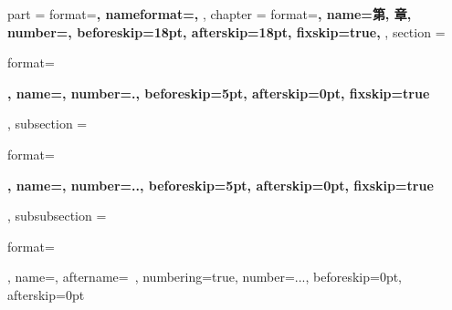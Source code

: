 {

    {
        \ctexset
        {
            part =
            {
                format=\centering{}\bfseries,
                nameformat=\centering\heiti\fontsize{48}{48}\bfseries,
            },
            chapter =
            {
                format=\centering{}\bfseries,
                name={第, 章},
                number=,
                beforeskip=18pt,
                afterskip=18pt,
                fixskip=true,
            },
            section =
            {
                format=\raggedright{}\bfseries,
                name={},
                number=.,
                beforeskip=5pt,
                afterskip=0pt,
                fixskip=true
            },
            subsection =
            {
                format=\raggedright{}\bfseries,
                name={},
                number=..,
                beforeskip=5pt,
                afterskip=0pt,
                fixskip=true
            },
            subsubsection =
            {
                format=\raggedright{},
                name={},
                aftername=~,
                numbering=true,
                number=...,
                beforeskip=0pt,
                afterskip=0pt
            }
        }

        \renewcommand{\chapternonum}[1]
        {
            \phantomsection
            \addcontentsline{toc}{chapter}{#1}
            \markboth{#1}{#1}
            \chapter*{#1}
        }

}}
